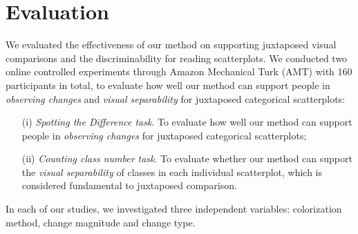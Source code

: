\section {Evaluation}
\label{sec:results}

We evaluated the effectiveness of our method on supporting juxtaposed visual comparisons and the discriminability for reading scatterplots.%
We conducted two online controlled experiments through Amazon Mechanical Turk (AMT) with 160 participants in total, to evaluate how well our method can support people in \emph{observing changes} and \emph{visual separability} for juxtaposed categorical scatterplots:
\begin{enumerate}
\item [(i)] \emph{Spotting the Difference task}. To evaluate how well our method can support people in \emph{observing changes} for juxtaposed categorical scatterplots;
\item [(ii)] \emph{Counting class number task}. To evaluate whether our method can support the \emph{visual separability} of classes in each individual scatterplot, which is considered fundamental to juxtaposed comparison.
\end{enumerate}

\vspace{.3em}
 In each of our studies, we investigated three independent variables: colorization method, change magnitude and change type.

